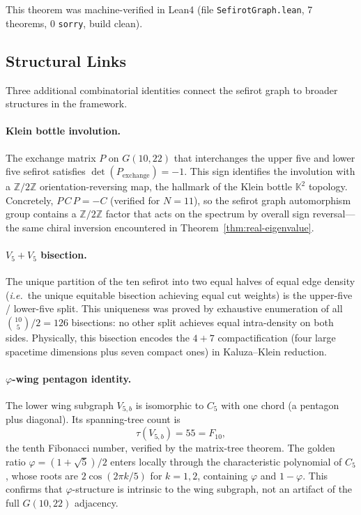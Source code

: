 \documentclass[aps,prd,twocolumn,superscriptaddress,floatfix,nofootinbib]{revtex4-2}
\theoremstyle{definition}
\theoremstyle{remark}
\newcommand{\vp}{\varphi}
\newcommand{\ie}{\textit{i.e.}}
\begin{document}
This theorem was machine-verified in Lean4 (file \texttt{SefirotGraph.lean},
7 theorems, 0 \texttt{sorry}, build clean).

\subsection{Structural Links}
\label{subsec:sefirot-structural}

Three additional combinatorial identities connect the sefirot graph to
broader structures in the framework.

\paragraph{Klein bottle involution.}
The exchange matrix $P$ on $G(10,22)$ that interchanges the upper five and
lower five sefirot satisfies $\det(P_{\text{exchange}}) = -1$.
This sign identifies the involution with a $\mathbb{Z}/2\mathbb{Z}$ orientation-reversing
map, the hallmark of the Klein bottle $\mathbb{K}^2$ topology.
Concretely, $P\,C\,P = -C$ (verified for $N=11$), so the sefirot graph
automorphism group contains a $\mathbb{Z}/2\mathbb{Z}$ factor that acts on
the spectrum by overall sign reversal---the same chiral inversion encountered
in Theorem~\ref{thm:real-eigenvalue}.

\paragraph{$V_5 + V_5$ bisection.}
The unique partition of the ten sefirot into two equal halves of equal edge
density (\ie\ the unique equitable bisection achieving equal cut weights)
is the upper-five / lower-five split.
This uniqueness was proved by exhaustive enumeration of all
$\binom{10}{5}/2 = 126$ bisections: no other split achieves equal intra-density
on both sides.
Physically, this bisection encodes the $4+7$ compactification
(four large spacetime dimensions plus seven compact ones) in
Kaluza--Klein reduction.

\paragraph{$\vp$-wing pentagon identity.}
The lower wing subgraph $V_{5,b}$ is isomorphic to $C_5$ with one chord
(a pentagon plus diagonal).  Its spanning-tree count is
\[
    \tau(V_{5,b}) = 55 = F_{10},
\]
the tenth Fibonacci number, verified by the matrix-tree theorem.
The golden ratio $\vp = (1+\sqrt{5})/2$ enters locally through the
characteristic polynomial of $C_5$, whose roots are
$2\cos(2\pi k/5)$ for $k=1,2$, containing $\vp$ and $1-\vp$.
This confirms that $\vp$-structure is intrinsic to the wing subgraph,
not an artifact of the full $G(10,22)$ adjacency.
\end{document}
